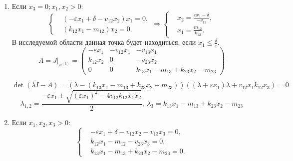 \begin{enumerate}
        \item Если \( x_3 = 0; x_1, x_2 > 0 \):
            \[
                \left\{\begin{split}
                    & \left( -\varepsilon x_1 + \delta - v_{12} x_2 \right)x_1 = 0, \\
                    & ( k_{12} x_1 -m _{12} ) x_2 = 0. 
                \end{split}\right.
                \Rightarrow
                \left\{\begin{split}
                    & x_2 = \frac{ \varepsilon x_1 - \delta }{ -v_{12} }, \\
                    & x_1 = \frac{m_{12}}{k_{12}}. 
                \end{split}\right.
            \]
            В исследуемой области данная точка будет находиться, если \( x_1 \leq \frac{\delta}{\varepsilon}  \).
            \[
                A = J\big|_{x^{(3)}} = \left(
                    \begin{matrix}
                        -\varepsilon x_1 & -v_{12}  x_1  & -v_{13} x_1 \\
                        k_{12} x_2 & 0 & -v_{23} x_2 \\
                        0 & 0 & k_{13} x_1 - m_{13} + k_{23} x_2 - m_{23}
                    \end{matrix}
                \right)
            \]

            \[
                \det(\lambda I - A) = \left( \lambda - \left( k_{13} x_1 - m_{13} + k_{23} x_2 - m_{23} \right) \right) \left( (\lambda + \varepsilon x_1)\lambda + v_{12} x_1 k_{12} x_3 \right) = 0
            \]
            \[
                \lambda_{1,2} = \frac{-\varepsilon x_1 \pm \sqrt{ (\varepsilon x_1)^2 - 4 v_{12} k_{12} x_1 x_2 } }{2}, ~ 
                \lambda_3 = k_{13} x_1 - m_{13} + k_{23} x_2 - m_{23}
            \]
        \item Если \( x_1, x_2, x_3 > 0 \):
            \[
                \left\{\begin{split}
                    & -\varepsilon x_1 + \delta - v_{12} x_2 - v_{13} x_3 = 0, \\
                    & k_{12} x_1 - m_{12} - v_{23} x_3 = 0, \\
                    & k_{13} x_1 - m_{13} + k_{23} x_2 - m_{23} = 0. 
                \end{split}\right.
            \]


\end{enumerate}
